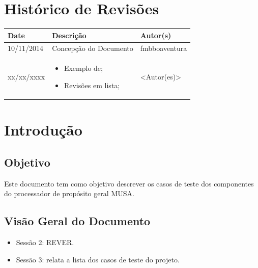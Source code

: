 \documentclass{article}
\begin{document}

\capa
\newpage

\section*{\center Histórico de Revisões}
  \vspace*{1cm}
  \begin{table}[ht]
    \centering
    \begin{tabular}[pos]{|m{2cm} | m{7.2cm} | m{3.8cm}|} 
      \hline
      \cellcolor[gray]{0.9}
      \textbf{Date} & \cellcolor[gray]{0.9}\textbf{Descrição} & \cellcolor[gray]{0.9}\textbf{Autor(s)}\\ \hline
      \hline
      \small 10/11/2014 & \small Concepção do Documento & \small fmbboaventura \\ \hline      
      \small xx/xx/xxxx &
      \begin{small}
        \begin{itemize}
          \item Exemplo de;
          \item Revisões em lista;
        \end{itemize}
      \end{small} & \small <Autor(es)> \\ \hline 
    \end{tabular}
  \end{table}

\newpage

\tableofcontents
\newpage

\section{Introdução}

  \subsection{Objetivo}
  Este documento tem como objetivo descrever os casos de teste dos componentes do processador de propósito geral MUSA.
  
  \subsection{Visão Geral do Documento}
  \begin{itemize}
    \item Sessão 2: REVER.
    \item Sessão 3: relata a lista dos casos de teste do projeto.
  \end{itemize}
  
\end{document}
